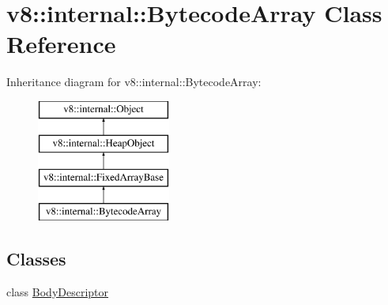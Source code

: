 \hypertarget{classv8_1_1internal_1_1_bytecode_array}{}\section{v8\+:\+:internal\+:\+:Bytecode\+Array Class Reference}
\label{classv8_1_1internal_1_1_bytecode_array}
Inheritance diagram for v8\+:\+:internal\+:\+:Bytecode\+Array\+:\begin{figure}[H]
\begin{center}
\leavevmode
\includegraphics[height=4.000000cm]{classv8_1_1internal_1_1_bytecode_array}
\end{center}
\end{figure}
\subsection*{Classes}
\begin{DoxyCompactItemize}
\item 
class \hyperlink{classv8_1_1internal_1_1_bytecode_array_1_1_body_descriptor}{Body\+Descriptor}
\end{DoxyCompactItemize}
